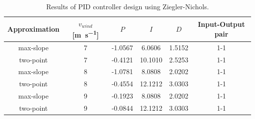 \begin{table}[H]
    \caption{Results of PID controller design using Ziegler-Nichols.}
    \centering
    \begin{tabular}{cccccc} \toprule
        Approximation & $v_{wind}$ [\si{\metre\per\second}] &$P$ & $I$ & $D$ & Input-Output pair \\ \midrule
        max-slope     & 7 & -1.0567 & 6.0606  & 1.5152 & 1-1 \\
        two-point     & 7 & -0.4121 & 10.1010 & 2.5253 & 1-1 \\
        max-slope     & 8 & -1.0781 & 8.0808  & 2.0202 & 1-1 \\
        two-point     & 8 & -0.4554 & 12.1212 & 3.0303 & 1-1 \\
        max-slope     & 9 & -0.1923 & 8.0808  & 2.0202 & 1-1 \\
        two-point     & 9 & -0.0844 & 12.1212 & 3.0303 & 1-1 \\ \bottomrule
    \end{tabular}
    \label{tab:condes:ZN:results}
\end{table}

